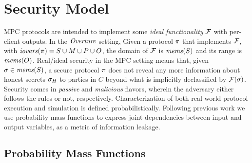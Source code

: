 \section{Security Model}
\label{section-pmf}
\label{section-model}

MPC protocols are intended to implement some \emph{ideal
functionality} $\mathcal{F}$ with per-client outputs. In the $\mathit{Overture}$
setting, Given a protocol $\pi$ that implements $\mathcal{F}$, with
$\mathit{iovars}(\pi) = S \cup M \cup P \cup O$, the domain of $\mathcal{F}$
is $\mathit{mems}(S)$ and its range is $\mathit{mems}(O)$.  Real/ideal security in the MPC
setting means that, given $\sigma \in \mathit{mems}(S)$, a secure protocol
$\pi$ does not reveal any more information about honest secrets
$\sigma_H$ to parties in $C$ beyond what is implicitly declassified by
$\mathcal{F}(\sigma)$. Security comes in \emph{passive} and
\emph{malicious} flavors, wherein the adversary either follows the
rules or not, respectively. Characterization of both real world
protocol execution and simulation is defined
probabilistically. Following previous work
\cite{barthe2019probabilistic} we use probability mass functions to
express joint dependencies between input and output variables, as a
metric of information leakage.

\subsection{Probability Mass Functions} 

